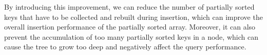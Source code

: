 By introducing this improvement, we can reduce the number of partially sorted keys that have to be collected and rebuilt during insertion, which can improve the overall insertion performance of the partially sorted array. Moreover, it can also prevent the accumulation of too many partially sorted keys in a node, which can cause the tree to grow too deep and negatively affect the query performance.